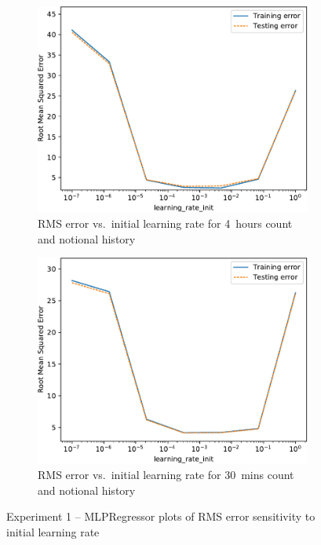 \begin{figure}[!ht]
\begin{subfigure}[t]{.47\linewidth}
        \includegraphics[width=0.9\linewidth]{./figures/AplotB7.pdf}
        \caption{RMS error vs.~initial learning rate for 4~hours count and notional history}\label{AppAplotB7}
    \end{subfigure}\hfill%
    \begin{subfigure}[t]{.47\linewidth}\centering
        \includegraphics[width=0.9\linewidth]{./figures/AplotB8.pdf}
        \caption{RMS error vs.~initial learning rate for 30~mins count and notional history}\label{AppAplotB8}
    \end{subfigure}
    \caption{Experiment 1 -- MLPRegressor plots of RMS error sensitivity to initial learning rate }\label{App:Exp1_plots2}
\end{figure}

